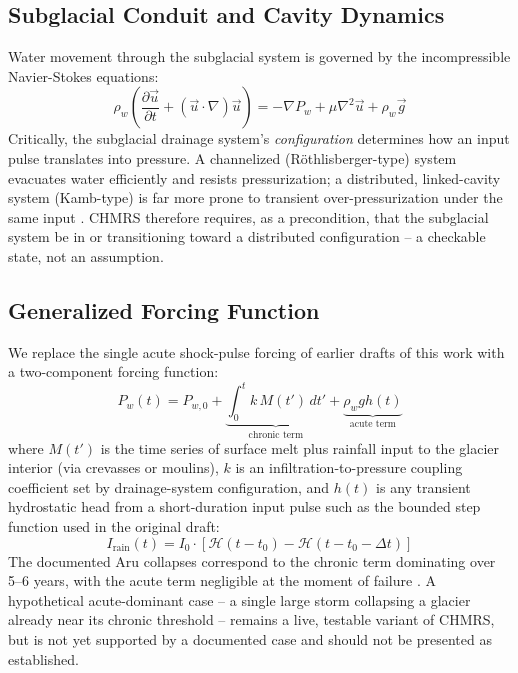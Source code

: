 \documentclass[11pt,twocolumn]{article}
\begin{document}
\subsection{Subglacial Conduit and Cavity Dynamics}
Water movement through the subglacial system is governed by the incompressible Navier-Stokes equations:
\begin{equation}
\rho_w \left( \frac{\partial \vec{u}}{\partial t} + (\vec{u} \cdot \nabla)\vec{u} \right) = -\nabla P_w + \mu \nabla^2 \vec{u} + \rho_w \vec{g}
\end{equation}
Critically, the subglacial drainage system's \emph{configuration} determines how an input pulse translates into pressure. A channelized (Röthlisberger-type) system evacuates water efficiently and resists pressurization; a distributed, linked-cavity system (Kamb-type) is far more prone to transient over-pressurization under the same input \cite{kamb1987}. CHMRS therefore requires, as a precondition, that the subglacial system be in or transitioning toward a distributed configuration -- a checkable state, not an assumption.

\subsection{Generalized Forcing Function}
We replace the single acute shock-pulse forcing of earlier drafts of this work with a two-component forcing function:
\begin{equation}
P_w(t) = P_{w,0} + \underbrace{\int_0^t k \, M(t')\,dt'}_{\text{chronic term}} + \underbrace{\rho_w g h(t)}_{\text{acute term}}
\end{equation}
where $M(t')$ is the time series of surface melt plus rainfall input to the glacier interior (via crevasses or moulins), $k$ is an infiltration-to-pressure coupling coefficient set by drainage-system configuration, and $h(t)$ is any transient hydrostatic head from a short-duration input pulse such as the bounded step function used in the original draft:
\begin{equation}
I_{\text{rain}}(t) = I_0 \cdot \left[ \mathcal{H}(t - t_0) - \mathcal{H}(t - t_0 - \Delta t) \right]
\end{equation}
The documented Aru collapses correspond to the chronic term dominating over 5--6 years, with the acute term negligible at the moment of failure \cite{gilbert2018}. A hypothetical acute-dominant case -- a single large storm collapsing a glacier already near its chronic threshold -- remains a live, testable variant of CHMRS, but is not yet supported by a documented case and should not be presented as established.
\end{document}

